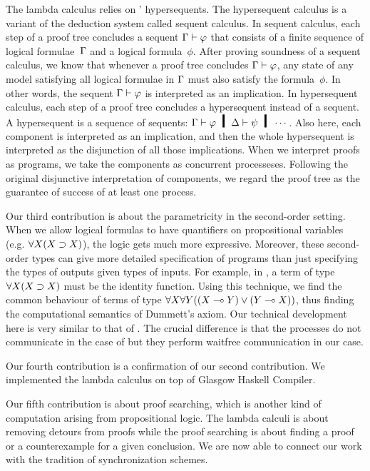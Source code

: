 The lambda calculus relies on \citet{avron91}' hypersequents.
The hypersequent calculus is a
variant of the deduction system called sequent calculus.  In sequent
calculus, each step of a proof tree concludes a sequent $\Gamma\vdash\varphi$ that
consists of a finite sequence of logical formulae~$\Gamma$ and a logical
formula~$\phi$.  After proving soundness of a sequent calculus, we know
that whenever a proof tree concludes $\Gamma\vdash\varphi$, any state of any model
satisfying all logical formulae in $\Gamma$ must also satisfy the
formula~$\phi$.  In other words, the sequent $\Gamma\vdash\varphi$ is
interpreted as an implication.  In hypersequent calculus, each step of a
proof tree concludes a hypersequent instead of a sequent.  A
hypersequent is a sequence of sequents: $\G\vdash\phi\hmid \D\vdash\psi
\hmid \cdots$.  Also here, each component is interpreted as an
implication, and then the whole hypersequent is interpreted as the
disjunction of all those implications.
When we interpret proofs as programs, we take the components as
concurrent processeses.  Following the original disjunctive
interpretation of components, we regard the proof tree as the guarantee of
success of at least one process.

Our third contribution is about the parametricity in the second-order
setting.  When we allow logical formulas to have quantifiers on
propositional variables (e.g. $\forall X(X\supset X)$), the logic gets much
more expressive.
Moreover, these second-order types can give more detailed specification
of programs than just specifying the types of outputs given types of
inputs.
For example, in , a term of type $\forall X(X\supset X)$
must be the identity function.
Using this technique, we find the common behaviour of terms of type
$\forall X \forall Y ((X\multimap Y)\lor (Y\multimap X))$, thus finding the
computational semantics of Dummett's axiom.
Our technical development here is very similar to that of
\citet{danos-krivine}.  The crucial difference is that the processes do
not communicate in the case of \citet{danos-krivine} but they perform
waitfree communication in our case.

Our fourth contribution is a confirmation of our second contribution.
We implemented the lambda calculus on top of
Glasgow Haskell Compiler.

Our fifth contribution is about proof searching, which is another
kind of computation arising from propositional logic.
The lambda calculi is about removing detours from proofs while the proof
searching is about finding a proof or a counterexample for a given
conclusion.  
We are now able to connect our work with the tradition of
synchronization schemes.

